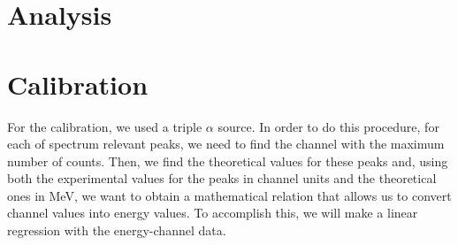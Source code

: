 \documentclass{article}
\begin{document}
\begin{multicols}{2}
\section*{Analysis}

\section{Calibration}
    \label{sec:calibration}

For the calibration, we used a triple $\alpha$ source.
In order to do this procedure, for each of spectrum relevant peaks, we need to find the channel with the maximum number of counts.
Then, we find the theoretical values for these peaks and, using both the experimental values for the peaks in channel units and the theoretical ones in MeV, we want to obtain a mathematical relation that allows us to convert channel values into energy values.
To accomplish this, we will make a linear regression with the energy-channel data.


\end{multicols}
\end{document}
